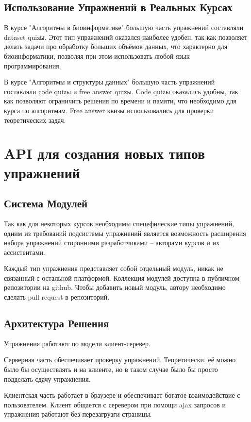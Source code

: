 \documentclass{matmex-diploma-custom}
\begin{document}
\subsection*{Использование Упражнений в Реальных Курсах}
В курсе "Алгоритмы в биоинформатике" большую часть упражнений
составляли dataset quizы. Этот тип упражнений оказался наиболее
удобен, так как позволяет делать задачи про обработку больших
объёмов данных, что характерно для биоинформатики, позволяя при
этом использовать любой язык программирования.

В курсе "Алгоритмы и структуры данных" большую часть упражнений
составляли code quizы и free answer quizы. Code quizы оказались
удобны, так как позволяют ограничить решения по времени и памяти,
что необходимо для курса по алгоритмам. Free answer квизы
использовались для проверки теоретических задач.

\section{API для создания новых типов упражнений}

\subsection*{Система Модулей}
Так как для некоторых курсов необходимы спецефические типы упражнений,
одним из требований подсистемы упражнений является возможность
расширения набора упражнений сторонними разработчиками -- авторами
курсов и их ассистентами.

Каждый тип упражнения представляет собой отдельный модуль, никак не
связанный с остальной платформой. Коллекция модулей доступна в
публичном репозитории на github. Чтобы добавить новый модуль, автору
необходимо сделать pull request в репозиторий.

\subsection*{Архитектура Решения}

Упражнения работают по модели клиент-серевер.

Серверная часть обеспечивает проверку упражнений. Теоретически, её можно было бы
осуществлять и на клиенте, но в таком случае было бы просто подделать
сдачу упражнения.

Клиентская часть работает в браузере и обеспечивает богатое
взаимодействие с пользователем. Клиент общается с серевером при помощи
ajax запросов и упражнения работают без перезагрузги страницы.
\end{document}
